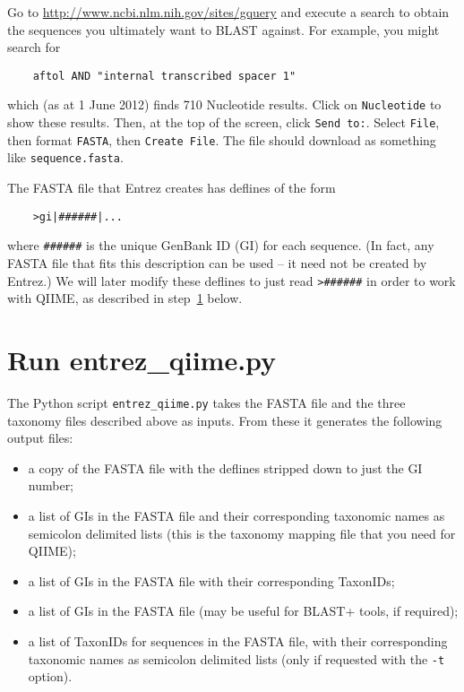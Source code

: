 \documentclass[11pt]{amsart}
\begin{document}
Go to \url{http://www.ncbi.nlm.nih.gov/sites/gquery} and execute a search to obtain the sequences you ultimately want to BLAST against. For example, you might search for

\begin{verbatim}
    aftol AND "internal transcribed spacer 1"
\end{verbatim}

which (as at 1 June 2012) finds 710 Nucleotide results. Click on \verb|Nucleotide| to show these results. Then, at the top of the screen, click \verb|Send to:|. Select \verb|File|, then format \verb|FASTA|, then \verb|Create File|. The file should download as something like \verb|sequence.fasta|.

The FASTA file that Entrez creates has deflines of the form

\begin{verbatim}
    >gi|######|...
\end{verbatim}

where \verb|######| is the unique GenBank ID (GI) for each sequence. (In fact, any FASTA file that fits this description can be used -- it need not be created by Entrez.) We will later modify these deflines to just read \verb|>######| in order to work with QIIME, as described in step~\ref{section:python} below.

\section{Run entrez\_qiime.py}
\label{section:python}

The Python script \verb|entrez_qiime.py| takes the FASTA file and the three taxonomy files described above as inputs. From these it generates the following output files:
\begin{itemize}
	\item a copy of the FASTA file with the deflines stripped down to just the GI number;
	\item a list of GIs in the FASTA file and their corresponding taxonomic names as semicolon delimited lists (this is the taxonomy mapping file that you need for QIIME);
	\item a list of GIs in the FASTA file with their corresponding TaxonIDs;
	\item a list of GIs in the FASTA file (may be useful for BLAST+ tools, if required);
	\item a list of TaxonIDs for sequences in the FASTA file, with their corresponding taxonomic names as semicolon delimited lists (only if requested with the \verb|-t| option).
\end{itemize}
\end{document}
